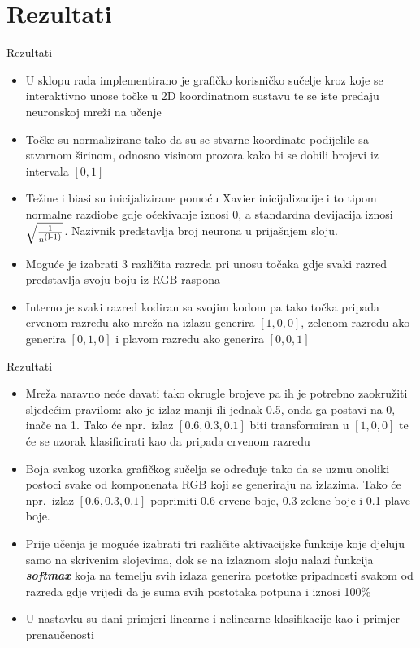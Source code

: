 \documentclass{beamer}
\begin{document}
\section{Rezultati}	
	\begin{frame}{Rezultati}
		\begin{itemize}
		    \item U sklopu rada implementirano je grafičko korisničko sučelje kroz koje se interaktivno unose točke u 2D koordinatnom sustavu te se iste predaju neuronskoj mreži na učenje
		    \item Točke su normalizirane tako da su se stvarne koordinate podijelile sa stvarnom širinom, odnosno visinom prozora kako bi se dobili brojevi iz intervala $[0,1]$
		    \item Težine i biasi su inicijalizirane pomoću Xavier inicijalizacije i to tipom normalne razdiobe gdje očekivanje iznosi 0, a standardna devijacija iznosi $\sqrt{\frac{1}{n\textsuperscript{(l-1)}}}$. Nazivnik predstavlja broj neurona u prijašnjem sloju.
		    \item Moguće je izabrati 3 različita razreda pri unosu točaka gdje svaki razred predstavlja svoju boju iz RGB raspona
		    \item Interno je svaki razred kodiran sa svojim kodom pa tako točka pripada crvenom razredu ako mreža na izlazu generira $[1, 0, 0]$, zelenom razredu ako generira $[0, 1, 0]$ i plavom razredu ako generira $[0, 0, 1]$
		\end{itemize}
	\end{frame}
    \begin{frame}{Rezultati}
        \begin{itemize}
            \item Mreža naravno neće davati tako okrugle brojeve pa ih je potrebno zaokružiti sljedećim pravilom: ako je izlaz manji ili jednak 0.5, onda ga postavi na 0, inače na 1. Tako će npr.\ izlaz $[0.6, 0.3, 0.1]$ biti transformiran u $[1, 0, 0]$ te će se uzorak klasificirati kao da pripada crvenom razredu
            \item Boja svakog uzorka grafičkog sučelja se određuje tako da se uzmu onoliki postoci svake od komponenata RGB koji se generiraju na izlazima. Tako će npr.\ izlaz $[0.6, 0.3, 0.1]$ poprimiti 0.6 crvene boje, 0.3 zelene boje i 0.1 plave boje.
            \item Prije učenja je moguće izabrati tri različite aktivacijske funkcije koje djeluju samo na skrivenim slojevima, dok se na izlaznom sloju nalazi funkcija \textbf{\textit{softmax}} koja na temelju svih izlaza generira postotke pripadnosti svakom od razreda gdje vrijedi da je suma svih postotaka potpuna i iznosi 100\%
            \item U nastavku su dani primjeri linearne i nelinearne klasifikacije kao i primjer prenaučenosti
        \end{itemize}
    \end{frame}
\end{document}
